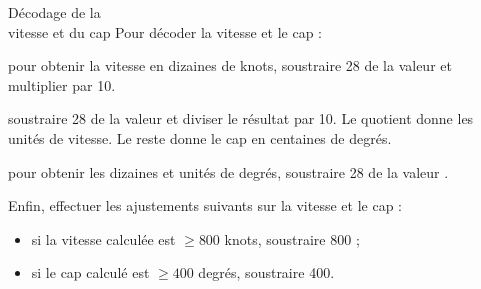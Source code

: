 \begin{aprssideblock}{Décodage de la\\vitesse et du cap}
Pour décoder la vitesse et le cap :

\begin{description}
\setlength{\itemsep}{0.55em}\setlength{\leftmargin}{3.3em}
\item[\lit{SP+28} :] pour obtenir la vitesse en dizaines de knots, soustraire
  28 de la valeur  et multiplier par 10.
\item[\lit{DC+28} :] soustraire 28 de la valeur  et diviser le
  résultat par 10. Le quotient donne les unités de vitesse. Le reste donne le
  cap en centaines de degrés.
\item[\lit{SE+28} :] pour obtenir les dizaines et unités de degrés, soustraire
  28 de la valeur .
\end{description}

Enfin, effectuer les ajustements suivants sur la vitesse et le cap :

\begin{itemize}\chTenItems
\item si la vitesse calculée est $\ge 800$ knots, soustraire 800 ;
\item si le cap calculé est $\ge 400$ degrés, soustraire 400.
\end{itemize}
\end{aprssideblock}

